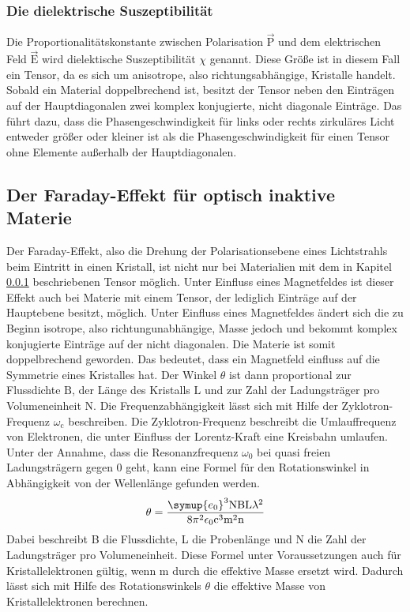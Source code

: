 \subsubsection{Die dielektrische Suszeptibilität}
\label{sssec:sus}
Die Proportionalitätskonstante zwischen Polarisation $\vec{\text{P}}$ und dem
elektrischen Feld $\vec{\text{E}}$ wird dielektische Suszeptibilität $\chi$
genannt. Diese Größe ist in diesem Fall ein Tensor, da es sich um anisotrope,
also richtungsabhängige, Kristalle handelt. Sobald ein Material doppelbrechend
ist, besitzt der Tensor neben den Einträgen auf der Hauptdiagonalen zwei
komplex konjugierte, nicht diagonale Einträge. Das führt dazu, dass die
Phasengeschwindigkeit für links oder rechts zirkuläres Licht entweder größer
oder kleiner ist als die Phasengeschwindigkeit für einen Tensor ohne Elemente
außerhalb der Hauptdiagonalen.

\subsection{Der Faraday-Effekt für optisch inaktive Materie}
Der Faraday-Effekt, also die Drehung der Polarisationsebene eines Lichtstrahls
beim Eintritt in einen Kristall, ist nicht nur bei Materialien mit dem in
Kapitel \ref{sssec:sus} beschriebenen Tensor möglich. Unter Einfluss eines
Magnetfeldes ist dieser Effekt auch bei Materie mit einem Tensor, der
lediglich Einträge auf der Hauptebene besitzt, möglich. Unter Einfluss eines
Magnetfeldes ändert sich die zu Beginn isotrope, also richtungunabhängige, Masse
jedoch und bekommt komplex konjugierte Einträge auf der nicht diagonalen. Die
Materie ist somit doppelbrechend geworden. Das bedeutet, dass ein Magnetfeld
einfluss auf die Symmetrie eines Kristalles hat. Der Winkel $\theta$ ist dann
proportional zur Flussdichte $\text{B}$, der Länge des Kristalls $\text{L}$ und
zur Zahl der Ladungsträger pro Volumeneinheit $\text{N}$. Die
Frequenzabhängigkeit lässt sich mit Hilfe der Zyklotron-Frequenz
$\omega_{\text{c}}$
beschreiben. Die Zyklotron-Frequenz beschreibt die Umlauffrequenz von Elektronen,
die unter Einfluss der Lorentz-Kraft eine Kreisbahn umlaufen. Unter der Annahme,
dass die Resonanzfrequenz $\omega_0$ bei quasi freien Ladungsträgern gegen
0 geht, kann eine Formel für den Rotationswinkel in Abhängigkeit von der
Wellenlänge gefunden werden.
\begin{equation}
  \theta = \frac{\symup{e_0}^3 \text{N} \text{B} \text{L} \lambda^2}
  {8 \pi^2 \epsilon_0 \text{c}^3 \text{m}^2 \text{n}}
  \label{eqn:ekelgleichung}
\end{equation}
Dabei beschreibt B die Flussdichte, L die Probenlänge und N die Zahl der
Ladungsträger pro Volumeneinheit. Diese Formel unter Voraussetzungen auch
für Kristallelektronen gültig, wenn m durch die effektive Masse ersetzt wird.
Dadurch lässt sich mit Hilfe des Rotationswinkels $\theta$ die effektive
Masse von Kristallelektronen berechnen.
